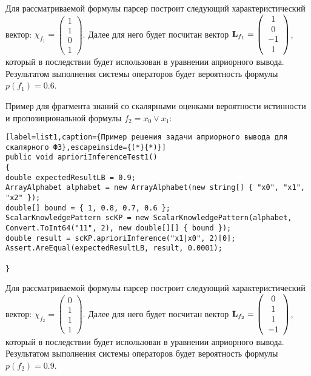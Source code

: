 Для рассматриваемой формулы парсер построит следующий характеристический вектор: $\chi_{f_1} = \left( \begin{array}{c}
1\\
1\\
0 \\
1
\end{array}  \right)$. Далее для него будет посчитан вектор ${\bf L}_{f_1} = \left( \begin{array}{c}
1\\
0\\
-1 \\
1
\end{array}  \right)$, который в последствии будет использован в уравнении априорного вывода. Результатом выполнения системы операторов будет вероятность формулы $p(f_1) = 0.6$.



Пример для фрагмента знаний со скалярными оценками вероятности истинности и пропозициональной формулы $f_2 = x_0 \vee x_1$:

\begin{lstlisting}[label=list1,caption={Пример решения задачи априорного вывода для скалярного ФЗ},escapeinside={(*}{*)}]
public void aprioriInferenceTest1()
{
double expectedResultLB = 0.9;
ArrayAlphabet alphabet = new ArrayAlphabet(new string[] { "x0", "x1", "x2" });
double[] bound = { 1, 0.8, 0.7, 0.6 };
ScalarKnowledgePattern scKP = new ScalarKnowledgePattern(alphabet, Convert.ToInt64("11", 2), new double[][] { bound });
double result = scKP.aprioriInference("x1|x0", 2)[0];    
Assert.AreEqual(expectedResultLB, result, 0.0001);

}
\end{lstlisting}

Для рассматриваемой формулы парсер построит следующий характеристический вектор: $\chi_{f_2} = \left( \begin{array}{c}
0\\
1\\
1 \\
1
\end{array}  \right)$. Далее для него будет посчитан вектор ${\bf L}_{f_2} = \left( \begin{array}{c}
0\\
1\\
1 \\
-1
\end{array}  \right)$, который в последствии будет использован в уравнении априорного вывода. Результатом выполнения системы операторов будет вероятность формулы $p(f_2) = 0.9$.


